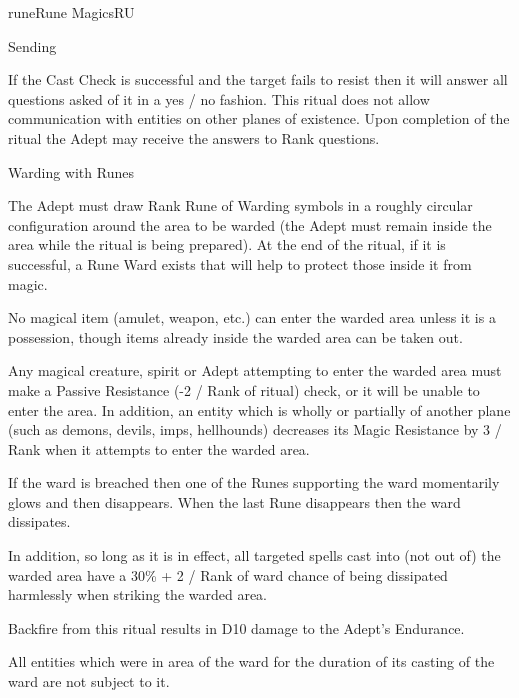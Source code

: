 \begin{College}[2.2]{rune}{Rune Magics}{RU}
\begin{ritual}[Q-3]{Sending}
\begin{effects}
If the Cast Check is successful and the target fails to resist then it
will answer all questions asked of it in a yes / no fashion.  This
ritual does not allow communication with entities on other planes of
existence. Upon completion of the ritual the Adept may receive the
answers to Rank questions.
\end{effects}
\end{ritual}

\begin{ritual}[Q-4]{Warding with Runes}

\begin{effects}
The Adept must draw Rank Rune of Warding symbols in a roughly circular
configuration around the area to be warded (the Adept must remain
inside the area while the ritual is being prepared). At the end of the
ritual, if it is successful, a Rune Ward exists that will help to
protect those inside it from magic.

No magical item (amulet, weapon, etc.)  can enter the warded area
unless it is a possession, though items already inside the warded area
can be taken out.

Any magical creature, spirit or Adept attempting to enter the warded
area must make a Passive Resistance (-2 / Rank of ritual) check, or it
will be unable to enter the area.  In addition, an entity which is
wholly or partially of another plane (such as demons, devils, imps,
hellhounds) decreases its Magic Resistance by 3 / Rank when it
attempts to enter the warded area.

If the ward is breached then one of the Runes supporting the ward
momentarily glows and then disappears. When the last Rune disappears
then the ward dissipates.

In addition, so long as it is in effect, all targeted spells cast into
(not out of) the warded area have a 30\% + 2 / Rank of ward chance of
being dissipated harmlessly when striking the warded area.

Backfire from this ritual results in D10 damage to the Adept’s
Endurance.

All entities which were in area of the ward for the duration of its
casting of the ward are not subject to it.
\end{effects}
\end{ritual}



\end{College}
